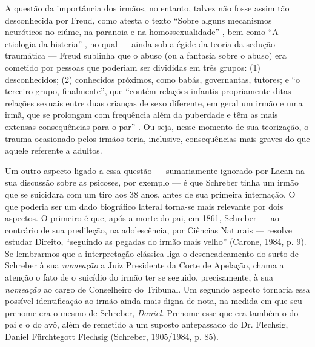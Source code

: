 A questão da importância dos irmãos, no entanto, talvez não fosse assim
tão desconhecida por Freud, como atesta o texto ``Sobre alguns
mecanismos neuróticos no ciúme, na paranoia e na homossexualidade'' ,
bem como ``A etiologia da histeria'' , no qual --- ainda sob a égide da
teoria da sedução traumática --- Freud sublinha que o abuso (ou a
fantasia sobre o abuso) era cometido por pessoas que poderiam ser
divididas em três grupos: (1) desconhecidos; (2) conhecidos próximos,
como babás, governantas, tutores; e ``o terceiro grupo, finalmente'',
que ``contém relações infantis propriamente ditas --- relações sexuais
entre duas crianças de sexo diferente, em geral um irmão e uma irmã, que
se prolongam com frequência além da puberdade e têm as mais extensas
consequências para o par'' . Ou seja, nesse momento de sua teorização, o
trauma ocasionado pelos irmãos teria, inclusive, consequências mais
graves do que aquele referente a adultos.

Um outro aspecto ligado a essa questão --- sumariamente ignorado por
Lacan na sua discussão sobre as psicoses, por exemplo --- é que Schreber
tinha um irmão que se suicidara com um tiro aos 38 anos, antes de sua
primeira internação. O que poderia ser um dado biográfico lateral
torna-se mais relevante por dois aspectos. O primeiro é que, após a
morte do pai, em 1861, Schreber --- ao contrário de sua predileção, na
adolescência, por Ciências Naturais --- resolve estudar Direito,
``seguindo as pegadas do irmão mais velho'' (Carone, 1984, p. 9). Se
lembrarmos que a interpretação clássica liga o desencadeamento do surto
de Schreber à sua \emph{nomeação} a Juiz Presidente da Corte de
Apelação, chama a atenção o fato de o suicídio do irmão ter se seguido,
precisamente, à sua \emph{nomeação} ao cargo de Conselheiro do Tribunal.
Um segundo aspecto tornaria essa possível identificação ao irmão ainda
mais digna de nota, na medida em que seu prenome era o mesmo de
Schreber, \emph{Daniel}. Prenome esse que era também o do pai e o do
avô, além de remetido a um suposto antepassado do Dr. Flechsig, Daniel
Fürchtegott Flechsig (Schreber, 1905/1984, p. 85).

